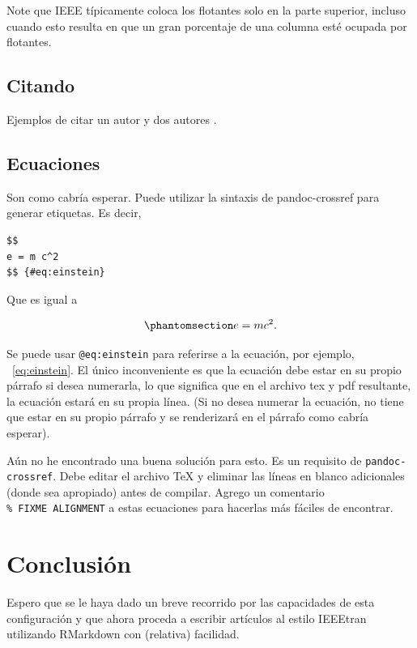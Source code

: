 \documentclass[a4paper,conference]{IEEEtran}
\let\citep\cite
\begin{document}
Note que IEEE típicamente coloca los flotantes solo en la parte
superior, incluso cuando esto resulta en que un gran porcentaje de una
columna esté ocupada por flotantes.

\subsection{Citando}\label{sec:citando}

Ejemplos de citar un autor \citep{Besag1974} y dos autores
\citep{Besag1974, Besag1986}.

\subsection{Ecuaciones}\label{sec:ecuaciones}

Son como cabría esperar. Puede utilizar la sintaxis de pandoc-crossref
para generar etiquetas. Es decir,

\begin{verbatim}
$$
e = m c^2
$$ {#eq:einstein}
\end{verbatim}

Que es igual a

\begin{equation}\phantomsection\label{eq:einstein}{
e = m c^2.
}\end{equation}

Se puede usar \texttt{@eq:einstein} para referirse a la ecuación, por
ejemplo, ~\ref{eq:einstein}. El único inconveniente es que la ecuación
debe estar en su propio párrafo si desea numerarla, lo que significa que
en el archivo tex y pdf resultante, la ecuación estará en su propia
línea. (Si no desea numerar la ecuación, no tiene que estar en su propio
párrafo y se renderizará en el párrafo como cabría esperar).

Aún no he encontrado una buena solución para esto. Es un requisito de
\texttt{pandoc-crossref}. Debe editar el archivo TeX y eliminar las
líneas en blanco adicionales (donde sea apropiado) antes de compilar.
Agrego un comentario \texttt{\%\ FIXME\ ALIGNMENT} a estas ecuaciones
para hacerlas más fáciles de encontrar.

\section{Conclusión}\label{sec:conclusiuxf3n}

Espero que se le haya dado un breve recorrido por las capacidades de
esta configuración y que ahora proceda a escribir artículos al estilo
IEEEtran utilizando RMarkdown con (relativa) facilidad.
\end{document}
